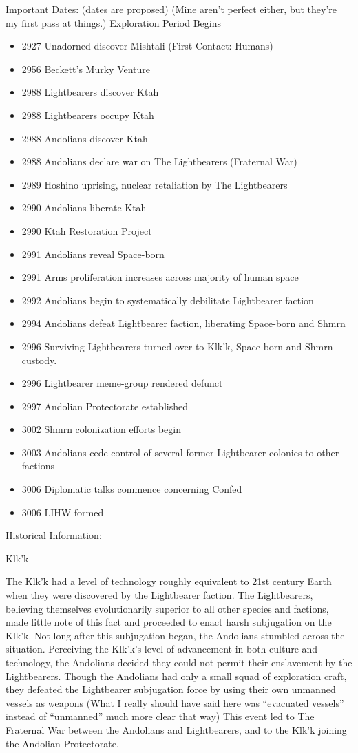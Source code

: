 Important Dates: (dates are proposed) (Mine aren't perfect either, but they're my first pass at things.)
Exploration Period Begins
\begin{itemize}
\item 2927 Unadorned discover Mishtali (First Contact: Humans)
\item 2956 Beckett's Murky Venture
\item 2988 Lightbearers discover Ktah
\item 2988 Lightbearers occupy Ktah
\item 2988 Andolians discover Ktah
\item 2988 Andolians declare war on The Lightbearers (Fraternal War)
\item 2989 Hoshino uprising, nuclear retaliation by The Lightbearers
\item 2990 Andolians liberate Ktah
\item 2990 Ktah Restoration Project
\item 2991 Andolians reveal Space-born
\item 2991 Arms proliferation increases across majority of human space
\item 2992 Andolians begin to systematically debilitate Lightbearer faction
\item 2994 Andolians defeat Lightbearer faction, liberating Space-born and Shmrn
\item 2996 Surviving Lightbearers turned over to Klk'k, Space-born and Shmrn custody.
\item 2996 Lightbearer meme-group rendered defunct
\item 2997 Andolian Protectorate established
\item 3002 Shmrn colonization efforts begin
\item 3003 Andolians cede control of several former Lightbearer colonies to other factions
\item 3006 Diplomatic talks commence concerning Confed
\item 3006 LIHW formed
\end{itemize}

Historical Information:

Klk'k

The Klk'k had a level of technology roughly equivalent to 21st century
Earth when they were discovered by the Lightbearer faction. The
Lightbearers, believing themselves evolutionarily superior to all
other species and factions, made little note of this fact and
proceeded to enact harsh subjugation on the Klk'k. Not long after this
subjugation began, the Andolians stumbled across the
situation. Perceiving the Klk'k's level of advancement in both culture
and technology, the Andolians decided they could not permit their
enslavement by the Lightbearers. Though the Andolians had only a small
squad of exploration craft, they defeated the Lightbearer subjugation
force by using their own unmanned vessels as weapons (What I really
should have said here was ``evacuated vessels'' instead of
``unmanned'' much more clear that way) This event led to The Fraternal
War between the Andolians and Lightbearers, and to the Klk'k joining
the Andolian Protectorate.

